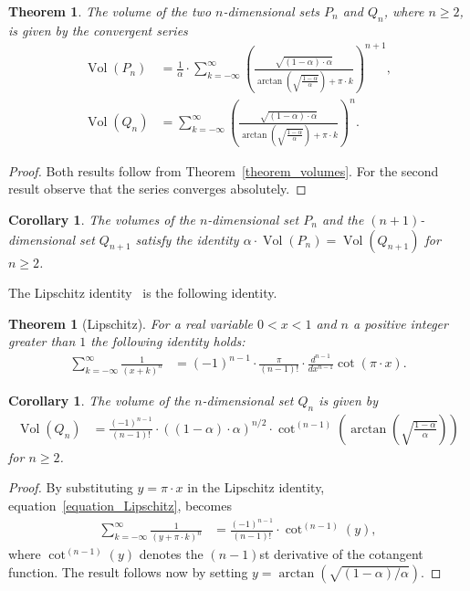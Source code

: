 \documentclass[11pt,reqno]{amsart}
\newtheorem{theorem}[lemma]{Theorem}
\newtheorem{corollary}[lemma]{Corollary}
\theoremstyle{definition}
\numberwithin{equation}{section}
\DeclareMathOperator{\Vol}{Vol}
\begin{document}
\begin{theorem}
The volume of the two $n$-dimensional sets $P_{n}$ and $Q_{n}$,
where $n \geq 2$,
is given by the convergent series
\begin{align*}
\Vol(P_{n})
& = 
\frac{1}{\alpha}
\cdot
\sum_{k = -\infty}^{\infty}
\left(
\frac{\sqrt{(1-\alpha) \cdot \alpha}}
{
\arctan\left(\sqrt{\frac{1-\alpha}{\alpha}}\right)
+
\pi \cdot k
}
\right)^{n+1} ,
\\
\Vol(Q_{n})
& =
\sum_{k = -\infty}^{\infty}
\left(
\frac{\sqrt{(1-\alpha) \cdot \alpha}}
{
\arctan\left(\sqrt{\frac{1-\alpha}{\alpha}}\right)
+
\pi \cdot k
}
\right)^{n} .
\end{align*}
\label{theorem_volumes_P_Q}
\end{theorem}
\begin{proof}
Both results follow from Theorem~\ref{theorem_volumes}.
For the second result
observe that the series converges absolutely.
\end{proof}


\begin{corollary}
The volumes of the $n$-dimensional set $P_{n}$
and the $(n+1)$-dimensional set $Q_{n+1}$
satisfy the identity
$\alpha \cdot \Vol(P_{n}) = \Vol(Q_{n+1})$
for $n \geq 2$.
\label{corollary_factor_alpha}
\end{corollary}

The Lipschitz identity~\cite{Lipschitz}
is the following identity.
\begin{theorem}[Lipschitz]
For a real variable $0 < x < 1$ and
$n$ a positive integer greater than $1$
the following identity holds:
\begin{align}
\sum_{k=-\infty}^{\infty} \frac{1}{(x+k)^{n}}
& =
(-1)^{n-1}
\cdot 
\frac{\pi}{(n-1)!}
\cdot
\frac{d^{n-1}}{dx^{n-1}} \cot(\pi \cdot x) . 
\label{equation_Lipschitz}
\end{align}
\label{theorem_Lipschitz}
\end{theorem}



\begin{corollary}
The volume of the $n$-dimensional set $Q_{n}$
is given by
\begin{align*}
\Vol(Q_{n})
& =
\frac{(-1)^{n-1}}{(n-1)!}
\cdot
((1-\alpha) \cdot  \alpha)^{n/2}
\cdot
\cot^{(n-1)}\left(\arctan\left(\sqrt{\frac{1-\alpha}{\alpha}}\right)\right)
\end{align*}
for $n \geq 2$.
\end{corollary}
\begin{proof}
By substituting $y = \pi \cdot x$ in the Lipschitz identity, equation~\eqref{equation_Lipschitz}, becomes
\begin{align*}
\sum_{k=-\infty}^{\infty} \frac{1}{(y + \pi \cdot k)^{n}}
& =
\frac{(-1)^{n-1}}{(n-1)!}
\cdot
\cot^{(n-1)}(y) , 
\end{align*}
where $\cot^{(n-1)}(y)$ denotes the $(n-1)$st derivative of the cotangent function.
The result follows now by setting $y = \arctan(\sqrt{(1-\alpha)/\alpha})$.
\end{proof}
\end{document}
